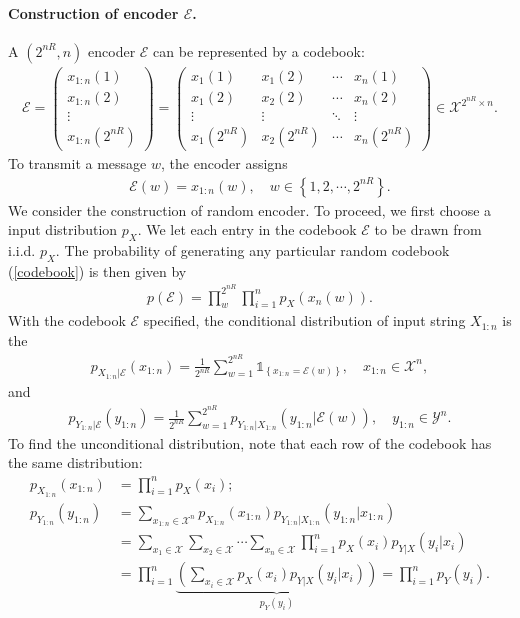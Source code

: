 \documentclass{article}
\numberwithin{equation}{section}
\renewcommand{\cal}{\mathcal}
\theoremstyle{plain}
\theoremstyle{definition}
\begin{document}
\paragraph{Construction of encoder $\cal{E}$.} A $(2^{nR},n)$ encoder $\cal{E}$ can be represented by a codebook:
\begin{align}
	\cal{E}=\begin{pmatrix}
		x_{1:n}(1) \\ x_{1:n}(2) \\ \vdots \\ x_{1:n}(2^{nR})
	\end{pmatrix} = \begin{pmatrix}
	x_1(1) & x_1(2) & \cdots & x_n(1) \\ x_1(2) & x_2(2) & \cdots & x_n(2) \\ \vdots & \vdots & \ddots & \vdots \\ x_1(2^{nR}) & x_2(2^{nR}) & \cdots & x_n(2^{nR})
\end{pmatrix}\in\cal{X}^{2^{nR}\times n}.\label{codebook}
\end{align}
To transmit a message $w$, the encoder assigns
\begin{align*}
	\cal{E}(w)=x_{1:n}(w),\quad w\in\left\{1,2,\cdots,2^{nR}\right\}.
\end{align*}
We consider the construction of random encoder. To proceed, we first choose a input distribution $p_X$. We let each entry in the codebook $\cal{E}$ to be drawn from i.i.d. $p_X$. The probability of generating any particular random codebook (\ref{codebook}) is then given by
\begin{align*}
	p(\cal{E})=\prod_w^{2^{nR}}\prod_{i=1}^n p_X(x_n(w)).
\end{align*}
With the codebook $\cal{E}$ specified, the conditional distribution of input string $X_{1:n}$ is the
\begin{align*}
	p_{X_{1:n}|\cal{E}}(x_{1:n})=\frac{1}{2^{nR}}\sum_{w=1}^{2^{nR}}\mathds{1}_{\left\{x_{1:n}=\cal{E}(w)\right\}},\quad x_{1:n}\in\cal{X}^n,
\end{align*}
and
\begin{align*}
	p_{Y_{1:n}|\cal{E}}(y_{1:n})=\frac{1}{2^{nR}}\sum_{w=1}^{2^{nR}}p_{Y_{1:n}|X_{1:n}}(y_{1:n}|\cal{E}(w)),\quad y_{1:n}\in\cal{Y}^n.
\end{align*}
To find the unconditional distribution, note that each row of the codebook has the same distribution:
\begin{align*}
	p_{X_{1:n}}(x_{1:n})&=\prod_{i=1}^n p_X(x_i);\\
	p_{Y_{1:n}}(y_{1:n})&=\sum_{x_{1:n}\in\cal{X}^n}p_{X_{1:n}}(x_{1:n})p_{Y_{1:n}|X_{1:n}}(y_{1:n}|x_{1:n})\\
	&=\sum_{x_1\in\cal{X}}\sum_{x_2\in\cal{X}}\cdots\sum_{x_n\in\cal{X}}\prod_{i=1}^np_{X}(x_i)p_{Y|X}(y_i|x_i)\\
	&=\prod_{i=1}^n\underbrace{\left(\sum_{x_i\in\cal{X}}p_X(x_i)p_{Y|X}(y_i|x_i)\right)}_{p_Y(y_i)}=\prod_{i=1}^n p_Y(y_i).
\end{align*}
\end{document}
